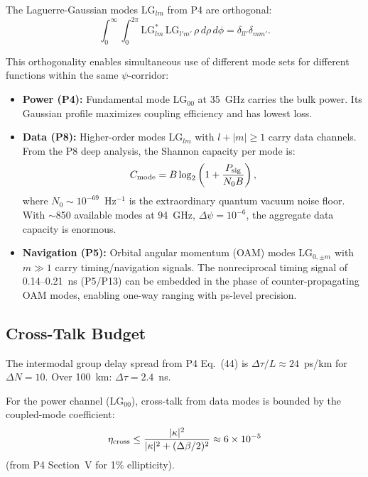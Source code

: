 \documentclass[aps,prd,twocolumn,superscriptaddress]{revtex4-2}
\begin{document}
The Laguerre-Gaussian modes $\text{LG}_{lm}$ from P4 are orthogonal:
\begin{equation}
\int_0^\infty\int_0^{2\pi} \text{LG}_{lm}^*\,\text{LG}_{l'm'}\,
\rho\,d\rho\,d\phi = \delta_{ll'}\delta_{mm'}.
\end{equation}

This orthogonality enables simultaneous use of different mode sets for
different functions within the same $\psi$-corridor:

\begin{itemize}
\item \textbf{Power (P4):} Fundamental mode $\text{LG}_{00}$ at
35~GHz carries the bulk power.  Its Gaussian profile maximizes
coupling efficiency and has lowest loss.

\item \textbf{Data (P8):} Higher-order modes $\text{LG}_{lm}$ with
$l + |m| \geq 1$ carry data channels.  From the P8 deep analysis,
the Shannon capacity per mode is:
\begin{equation}
C_{\rm mode} = B\log_2\left(1 + \frac{P_{\rm sig}}{N_0 B}\right),
\end{equation}
where $N_0 \sim 10^{-69}$~Hz$^{-1}$ is the extraordinary quantum
vacuum noise floor.  With $\sim$850 available modes at 94~GHz,
$\Delta\psi = 10^{-6}$, the aggregate data capacity is enormous.

\item \textbf{Navigation (P5):} Orbital angular momentum (OAM) modes
$\text{LG}_{0,\pm m}$ with $m \gg 1$ carry timing/navigation signals.
The nonreciprocal timing signal of 0.14--0.21~ns (P5/P13) can be
embedded in the phase of counter-propagating OAM modes, enabling
one-way ranging with ps-level precision.
\end{itemize}

\subsection{Cross-Talk Budget}

The intermodal group delay spread from P4 Eq.~(44) is
$\Delta\tau/L \approx 24$~ps/km for $\Delta N = 10$.
Over 100~km: $\Delta\tau = 2.4$~ns.

For the power channel ($\text{LG}_{00}$), cross-talk from data modes
is bounded by the coupled-mode coefficient:
\begin{equation}
\eta_{\rm cross} \leq \frac{|\kappa|^2}{|\kappa|^2 + (\Delta\beta/2)^2}
\approx 6\times 10^{-5}
\end{equation}
(from P4 Section~V for 1\% ellipticity).
\end{document}
